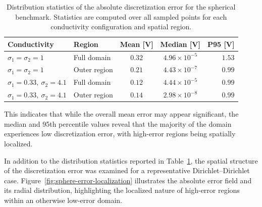 \begin{table}[htbp]
\centering
\caption[Spherical benchmark discretization error distributions]
{Distribution statistics of the absolute discretization error for the spherical benchmark. Statistics are computed over all sampled points for each conductivity configuration and spatial region.}
\label{tab:sphere-error-distributions}
\small
\begin{tabularx}{\textwidth}{l l c c r}
\toprule
\textbf{Conductivity} 
& \textbf{Region} 
& \textbf{Mean [V]} 
& \textbf{Median [V]}
& \textbf{P95 [V]} \\
\midrule
$\sigma_1=\sigma_2=1$
& Full domain
& $0.32$
& $4.96\times10^{-5}$
& $1.53$ \\

$\sigma_1=\sigma_2=1$
& Outer region
& $0.21$
& $4.43\times10^{-7}$
& $0.99$ \\[4pt]

$\sigma_1=0.33,\ \sigma_2=4.1$
& Full domain
& $0.12$
& $4.44\times10^{-5}$
& $0.99$ \\

$\sigma_1=0.33,\ \sigma_2=4.1$
& Outer region
& $0.14$
& $2.98\times10^{-8}$
& $0.99$ \\[4pt]


\bottomrule
\end{tabularx}
\end{table}

This indicates that while the overall mean error may appear significant, the median and
95th percentile values reveal that the majority of the domain experiences low discretization
error, with high-error regions being spatially localized.


In addition to the distribution statistics reported in Table~\ref{tab:sphere-error-distributions}, the spatial structure
of the discretization error was examined for a representative Dirichlet–Dirichlet case. Figure~\ref{fig:sphere-error-localization} 
illustrates the absolute error field and its radial distribution, highlighting the localized nature of high-error regions within an otherwise low-error domain.

